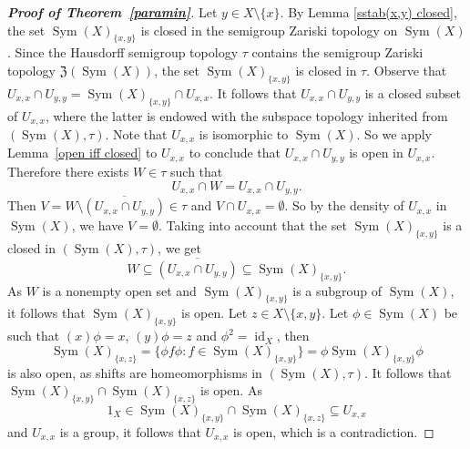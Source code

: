 \documentclass[11pt]{amsart}
\theoremstyle{definition}
\newcommand{\N}{\mathbb N}
\newcommand{\Sym}{\operatorname{Sym}}
\begin{document}
\begin{proof}[{\bf Proof of Theorem~\ref{paramin}}]
Let \(y\in X\setminus \{x\}\).  By Lemma \ref{sstab(x,y) closed}, the set  $\Sym(X)_{\{x,y\}}$ is closed in the semigroup Zariski topology on $\Sym(X)$. Since the Hausdorff semigroup topology $\tau$ contains the semigroup Zariski topology $\mathfrak{Z}(\Sym(X))$, the set $\Sym(X)_{\{x,y\}}$ is closed in $\tau$.
Observe that
$U_{x,x} \cap U_{y,y}=\Sym(X)_{\{x,y\}}\cap U_{x,x}$. It follows that $U_{x,x} \cap U_{y,y}$
is a closed subset of $U_{x,x}$, where the latter is endowed with the subspace topology inherited from $(\Sym(X),\tau)$.
Note that $U_{x,x}$ is isomorphic to $\Sym(X)$. So we apply Lemma~\ref{open iff closed} to $U_{x,x}$ to conclude that \(U_{x,x}\cap U_{y,y}\) is open in $U_{x,x}$.
Therefore there exists \(W\in \tau \) such that 
\[U_{x,x} \cap W =U_{x,x} \cap U_{y,y}.\] 
Then \(V=W\setminus \overline{(U_{x,x} \cap U_{y,y})} \in \tau\) and \(V \cap U_{x,x}= \emptyset\). 
So by the density of \(U_{x,x}\) in $\Sym(X)$, we have \(V= \emptyset\). Taking into account that the set $\Sym(X)_{\{x,y\}}$ is a closed in $(\Sym(X),\tau)$, we get 
\[W\subseteq \overline{(U_{x,x} \cap U_{y,y})}\subseteq \Sym(X)_{\{x,y\}}.\] As \(W\) is a nonempty open set and \(\Sym(X)_{\{x,y\}}\) is a subgroup of $\Sym(X)$, it follows that \(\Sym(X)_{\{x,y\}}\) is open. Let \(z\in X\setminus \{x,y\}\). Let \(\phi\in \Sym(X)\) be such that \((x)\phi=x\), \((y)\phi=z\) and \(\phi^{2}=\operatorname{id}_X\), then 
\[\Sym(X)_{\{x,z\}}=\{\phi f\phi: f\in \Sym(X)_{\{x,y\}}\}=\phi \Sym(X)_{\{x,y\}}\phi\] is also open, as shifts are homeomorphisms in $(\Sym(X),\tau)$.
 It follows that \( \Sym(X)_{\{x,y\}}\cap \Sym(X)_{\{x,z\}}\) is open. As
\[1_{X}\in \Sym(X)_{\{x,y\}}\cap \Sym(X)_{\{x,z\}} \subseteq U_{x, x}\]
and \(U_{x, x}\) is a group, it follows that \(U_{x, x}\) is open, which is a contradiction.
\end{proof}
\end{document}
